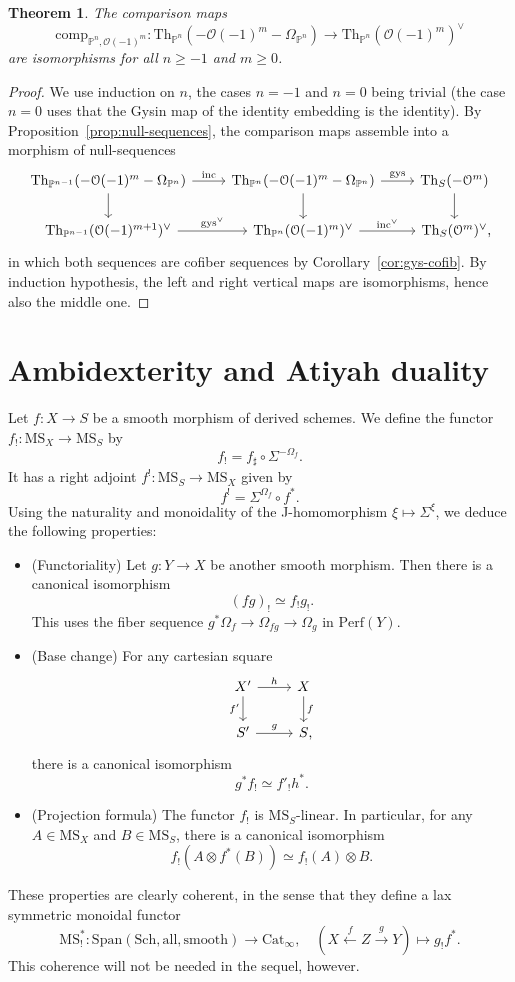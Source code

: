 \documentclass{amsart}
\numberwithin{equation}{section}
\theoremstyle{plain}
\newtheorem{theorem}[equation]{Theorem}
\theoremstyle{definition}
\let\scr=\mathcal
\let\bb=\mathbb
\let\rm=\mathrm
\def\P{\bb P}
\def\Th{\mathrm{Th}}
\let\cat=\mathrm
\def\Sch{\cat{S}\mathrm{ch}{}}
\def\MS{\mathrm{MS}}
\def\Cat{\mathrm{C}\mathrm{at}{}}
\def\all{\mathrm{all}}
\def\Span{\mathrm{Span}}
\def\Perf{\mathrm{Perf}{}}
\def\gys{\mathrm{gys}{}}
\begin{document}
\begin{theorem}\label{thm:dualsofP}
The comparison maps
\[
\rm{comp}_{\P^n,\scr O(-1)^m} \colon \Th_{\P^n}(- \scr O(-1)^{m} - \Omega_{\P^n}) \to \Th_{\P^n}(\scr O(-1)^{m})^\vee
\]
are isomorphisms for all $n\geq -1$ and $m\geq 0$.
\end{theorem}

\begin{proof}
We use induction on $n$, the cases $n=-1$ and $n=0$ being trivial (the case $n=0$ uses that the Gysin map of the identity embedding is the identity).
By Proposition~\ref{prop:null-sequences}, the comparison maps assemble into a morphism of null-sequences
\[
\begin{tikzcd}
	\Th_{\P^{n-1}}(- \scr O(-1)^{m}-\Omega_{\P^n}) \ar{r}{\mathrm{inc}} \ar{d} & \Th_{\P^n}(- \scr O(-1)^{m}- \Omega_{\P^n}) \ar{r}{\gys} \ar{d} & \Th_S(-\scr O^m) \ar{d} \\
	\Th_{\P^{n-1}}(\scr O(-1)^{m+1})^\vee \ar{r}{\gys^\vee} & \Th_{\P^n}(\scr O(-1)^{m})^\vee \ar{r}{\mathrm{inc}^\vee} & \Th_S(\scr O^m)^\vee\rlap,
\end{tikzcd}
\]
in which both sequences are cofiber sequences by Corollary~\ref{cor:gys-cofib}. By induction hypothesis, the left and right vertical maps are isomorphisms, hence also the middle one.
\end{proof}

\section{Ambidexterity and Atiyah duality}

Let $f\colon X\to S$ be a smooth morphism of derived schemes. We define the functor $f_!\colon \MS_X\to \MS_S$ by
\[
f_!=f_\sharp \circ \Sigma^{-\Omega_{f}}.
\]
It has a right adjoint $f^!\colon \MS_S\to \MS_X$ given by
\[
f^!=\Sigma^{\Omega_f}\circ f^*.
\]
Using the naturality and monoidality of the J-homomorphism $\xi\mapsto \Sigma^\xi$, we deduce the following properties:
\begin{itemize}
	\item (Functoriality) Let $g\colon Y\to X$ be another smooth morphism. Then there is a canonical isomorphism
	\[
	(fg)_!\simeq f_!g_!.
	\]
	This uses the fiber sequence $g^*\Omega_f\to \Omega_{fg}\to \Omega_g$ in $\Perf(Y)$.
	\item (Base change) For any cartesian square
	\[
	\begin{tikzcd}
		X' \ar{r}{h} \ar{d}[swap]{f'} & X \ar{d}{f} \\
		S' \ar{r}{g} & S\rlap,
	\end{tikzcd}
	\]
	 there is a canonical isomorphism
	\[
	g^*f_!\simeq f'_!h^*.
	\]
	\item (Projection formula) The functor $f_!$ is $\MS_S$-linear. In particular, for any $A\in \MS_X$ and $B\in \MS_S$, there is a canonical isomorphism
	\[
	f_!(A\otimes f^*(B)) \simeq f_!(A)\otimes B.
	\]
\end{itemize}
These properties are clearly coherent, in the sense that they define a lax symmetric monoidal functor
\[
\MS^*_!\colon\Span(\Sch,\all,\mathrm{smooth})\to \Cat_\infty, \quad (X\xleftarrow{f} Z\xrightarrow{g} Y)\mapsto g_!f^*.
\]
This coherence will not be needed in the sequel, however.
\end{document}
